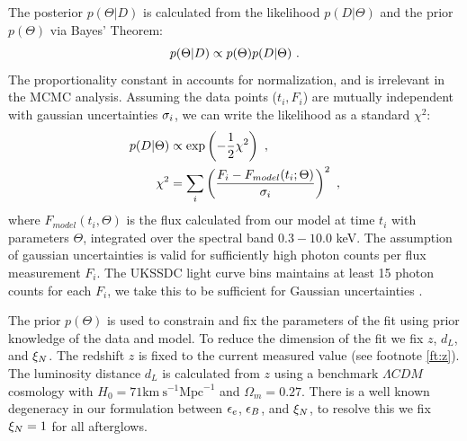 The posterior $p(\Theta | D) $ is calculated from the likelihood $p(D | \Theta)$ and the prior $p(\Theta)$ via Bayes' Theorem:
\begin{equation}\eqlabel{bayes}
	p(\Theta | D) \propto p(\Theta) p(D | \Theta) \ .
\end{equation}
The proportionality constant in  accounts for normalization, and is irrelevant in the MCMC analysis.  Assuming the data points ($t_i,F_i$) are mutually independent with gaussian uncertainties $\sigma_i$, we can write the likelihood as a standard $\chi^2$:
\begin{align} \eqlabel{likelihood}
	p(D|\Theta) &\propto \exp\left(-\frac{1}{2} \chi^2 \right) \ ,\nonumber \\
    \chi^2 &= \sum_{i} \left(\frac{F_i - F_{model}(t_i; \Theta)}{\sig_i}\right)^2 \ , 
\end{align}
where $F_{model}(t_i, \Theta)$ is the flux calculated from our model at time $t_i$ with parameters $\Theta$, integrated over the \swiftXRT{} spectral band $0.3 - 10.0$ keV.  The assumption of gaussian uncertainties is valid for sufficiently high photon counts per flux measurement $F_i$.  The UKSSDC \XRT{} light curve bins maintains at least 15 photon counts for each $F_i$, we take this to be sufficient for Gaussian uncertainties \citep{SWIFTauto}.  

The prior $p(\Theta)$ is used to constrain and fix the parameters of the fit using prior knowledge of the data and model.  To reduce the dimension of the fit we fix $z$, $d_L$, and $\xi_N$.   The redshift $z$ is fixed to the current measured value (see footnote \ref{ft:z}).  The luminosity distance $d_L$ is calculated from $z$ using a benchmark $\Lambda CDM$ cosmology with $H_0 = 71\text{km}\ \text{s}^{-1} \text{Mpc}^{-1}$ and $\Omega_m = 0.27$.  There is a well known degeneracy in our formulation between $\epsilon_e$, $\epsilon_B$, and $\xi_N$, to resolve this we fix $\xi_N = 1$ for all afterglows.

